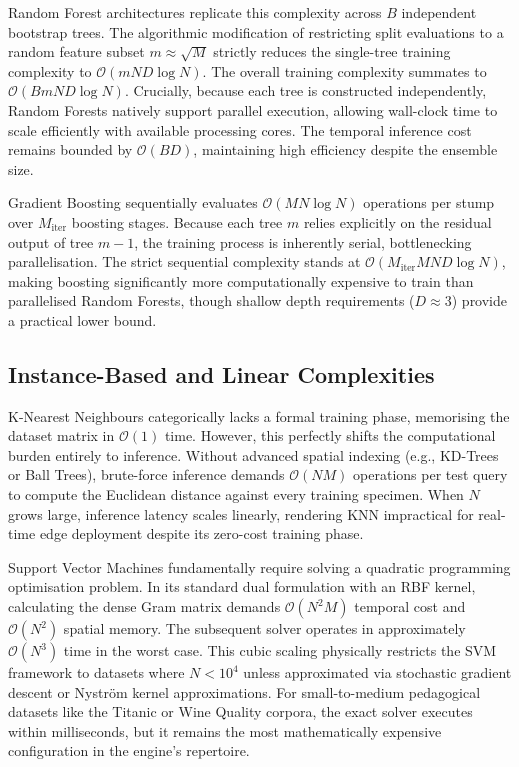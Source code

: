 \documentclass[conference]{IEEEtran}
\begin{document}
Random Forest architectures replicate this complexity across $B$ independent bootstrap trees. The algorithmic modification of restricting split evaluations to a random feature subset $m \approx \sqrt{M}$ strictly reduces the single-tree training complexity to $\mathcal{O}(m N D \log N)$. The overall training complexity summates to $\mathcal{O}(B m N D \log N)$. Crucially, because each tree is constructed independently, Random Forests natively support parallel execution, allowing wall-clock time to scale efficiently with available processing cores. The temporal inference cost remains bounded by $\mathcal{O}(B D)$, maintaining high efficiency despite the ensemble size.

Gradient Boosting sequentially evaluates $\mathcal{O}(M N \log N)$ operations per stump over $M_{\text{iter}}$ boosting stages. Because each tree $m$ relies explicitly on the residual output of tree $m-1$, the training process is inherently serial, bottlenecking parallelisation. The strict sequential complexity stands at $\mathcal{O}(M_{\text{iter}} M N D \log N)$, making boosting significantly more computationally expensive to train than parallelised Random Forests, though shallow depth requirements ($D \approx 3$) provide a practical lower bound.

\subsection{Instance-Based and Linear Complexities}

K-Nearest Neighbours categorically lacks a formal training phase, memorising the dataset matrix in $\mathcal{O}(1)$ time. However, this perfectly shifts the computational burden entirely to inference. Without advanced spatial indexing (e.g., KD-Trees or Ball Trees), brute-force inference demands $\mathcal{O}(N M)$ operations per test query to compute the Euclidean distance against every training specimen. When $N$ grows large, inference latency scales linearly, rendering KNN impractical for real-time edge deployment despite its zero-cost training phase.

Support Vector Machines fundamentally require solving a quadratic programming optimisation problem. In its standard dual formulation with an RBF kernel, calculating the dense Gram matrix demands $\mathcal{O}(N^2 M)$ temporal cost and $\mathcal{O}(N^2)$ spatial memory. The subsequent solver operates in approximately $\mathcal{O}(N^3)$ time in the worst case. This cubic scaling physically restricts the SVM framework to datasets where $N < 10^4$ unless approximated via stochastic gradient descent or Nystr\"{o}m kernel approximations. For small-to-medium pedagogical datasets like the Titanic or Wine Quality corpora, the exact solver executes within milliseconds, but it remains the most mathematically expensive configuration in the engine's repertoire.
\end{document}
